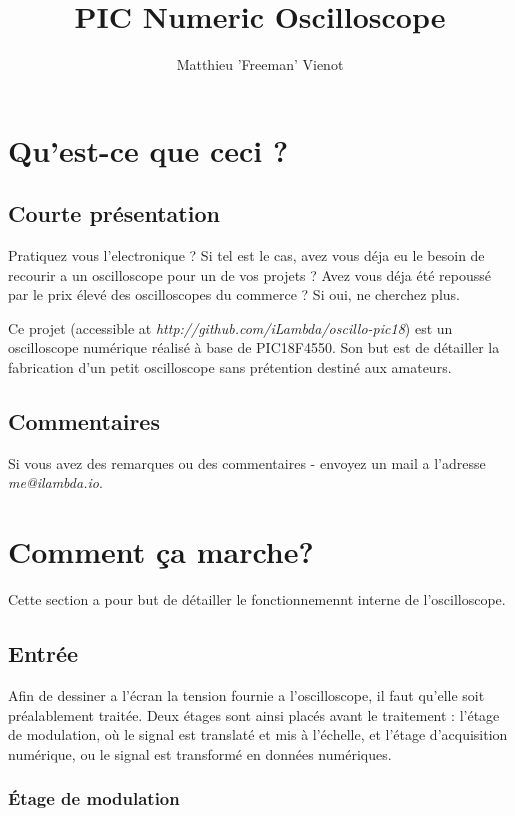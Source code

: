 \documentclass[11pt]{article}
\title{\textbf{PIC Numeric Oscilloscope}}
\author{Matthieu 'Freeman' Vienot}
\date{}
\begin{document}
\maketitle

\section{Qu'est-ce que ceci ?}
\subsection {\Large\bfseries{Courte présentation}}
Pratiquez vous l'electronique ? Si tel est le cas, avez vous déja eu le besoin de recourir a un oscilloscope pour un de vos projets ? Avez vous déja été repoussé par le prix élevé des oscilloscopes du commerce ? Si oui, ne cherchez plus.

Ce projet (accessible at \emph{http://github.com/iLambda/oscillo-pic18}) est un oscilloscope numérique réalisé à base de PIC18F4550. Son but est de détailler la fabrication d'un petit oscilloscope sans prétention destiné aux amateurs.

\subsection{Commentaires}
Si vous avez des remarques ou des commentaires - envoyez un mail a l'adresse \emph{me@ilambda.io}.

\section {Comment ça marche?}

Cette section a pour but de détailler le fonctionnemennt interne de l'oscilloscope.

\subsection{Entrée}

Afin de dessiner a l'écran la tension fournie a l'oscilloscope, il faut qu'elle soit préalablement traitée. Deux étages sont ainsi placés avant le traitement : l'étage de modulation, où le signal est translaté et mis à l'échelle, et l'étage d'acquisition numérique, ou le signal est transformé en données numériques.

\subsubsection{Étage de modulation}
\end{document}
